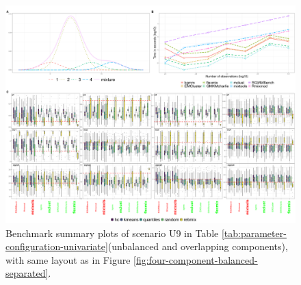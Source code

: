 \begin{figure}

{\centering \includegraphics[width=1\linewidth]{./figs/univariate/univariate_unbalanced_overlapping} 

}

\caption{Benchmark summary plots of scenario U9 in Table \ref{tab:parameter-configuration-univariate}(unbalanced and overlapping components), with same layout as in Figure \ref{fig:four-component-balanced-separated}.}\label{fig:four-component-unbalanced-overlapping}
\end{figure}

